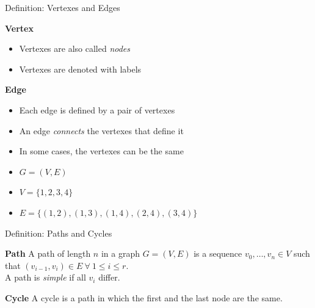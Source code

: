 \documentclass[compress]{beamer}
\begin{document}
\begin{frame}{Definition: Vertexes and Edges}
  \begin{block}{\textbf{Vertex}}
      \begin{itemize}
      \item Vertexes are also called \emph{nodes}
      \item Vertexes are denoted with labels
    \end{itemize}
  \end{block}
  \begin{block}{\textbf{Edge}}
      \begin{itemize}
      \item Each edge is defined by a pair of vertexes
      \item An edge \emph{connects} the vertexes that define it
      \item In some cases, the vertexes can be the same
  \end{itemize}
\end{block}
\end{frame}

\begin{frame}{}
  \begin{example}
    \begin{itemize}
    \item $G = (V, E)$
    \item $V = \{1, 2, 3, 4\}$
    \item $E = \{(1,2), (1,3), (1,4), (2,4), (3,4)\}$
    \end{itemize}
  \end{example}
  \begin{center}
  
  \end{center}
\end{frame}

\begin{frame}{Definition: Paths and Cycles}
  \begin{block}{\textbf{Path}}
    A path of length $n$ in a graph $G = (V, E)$ is a sequence $v_0, \dots, v_n \in V$ such that $(v_{i-1}, v_i) \in E \ \forall \ 1 \leq i \leq r$. \\

    A path is \emph{simple} if all $v_i$ differ.
  \end{block}
  \begin{block}{\textbf{Cycle}}
    A cycle is a path in which the first and the last node are the same.
  \end{block}
\end{frame}
\end{document}
